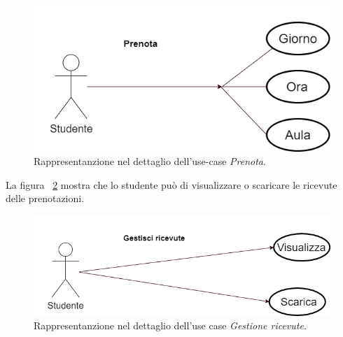 \begin{figure}[H]
\begin{center}
  \includegraphics[width=1 \textwidth]{Figure/use-case prenota.png}
    \caption{Rappresentanzione nel dettaglio dell’use-case \textit{Prenota}.}\label{figura: use-case prenota}
\end{center}
\end{figure}


La figura ~\ref{figura: use-case ricevute} mostra che lo studente può di visualizzare o scaricare le ricevute delle prenotazioni. \\
 
\begin{figure}[H]
\begin{center}
  \includegraphics[width=1 \textwidth]{Figure/use-case gestisci ricevute.png}
    \caption{Rappresentanzione nel dettaglio dell’use case \textit{Gestione ricevute}.}\label{figura: use-case ricevute}
\end{center}
\end{figure}



